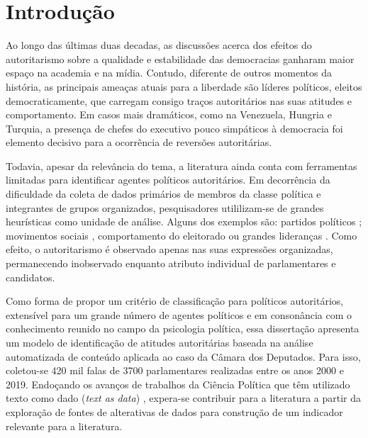 \documentclass[
12pt,				%
openright,			%
twoside,			%
a4paper,			%
english,			%
french,				%
spanish,			%
brazil				%
]{abntex2}
\begin{document}
\chapter{Introdução}

Ao longo das últimas duas decadas, as discussões acerca dos efeitos do autoritarismo sobre a qualidade e estabilidade das democracias ganharam maior espaço na academia e na mídia. Contudo, diferente de outros momentos da história, as principais ameaças atuais para a liberdade são líderes políticos, eleitos democraticamente, que carregam consigo traços autoritários nas suas atitudes e comportamento. Em casos mais dramáticos, como na Venezuela, Hungria e Turquia, a presença de chefes do executivo pouco simpáticos à democracia foi elemento decisivo para a ocorrência de reversões autoritárias.

Todavia, apesar da relevância do tema, a literatura ainda conta com ferramentas limitadas para identificar agentes políticos autoritários. Em decorrência da dificuldade da coleta de dados primários de membros da classe política e integrantes de grupos organizados, pesquisadores utililizam-se de grandes heurísticas como unidade de análise. Alguns dos exemplos são: partidos políticos \cite{mudde2009populist, loxton2014authoritarian, mudde2016introduction}; movimentos sociais \cite{caiani2017radical}, comportamento do eleitorado \cite{booth1984political, seligson2003democracies, seligson2005feeding, rydgren2007sociology} ou grandes lideranças \cite{levitsky2018democracies, norris2019cultural}. Como efeito, o autoritarismo é observado apenas nas suas expressões organizadas, permanecendo inobservado enquanto atributo individual de parlamentares e candidatos.

Como forma de propor um critério de classificação para políticos autoritários, extensível para um grande número de agentes políticos e em consonância com o conhecimento reunido no campo da psicologia política, essa dissertação apresenta um modelo de identificação de atitudes autoritárias baseada na análise automatizada de conteúdo aplicada ao caso da Câmara dos Deputados. Para isso, coletou-se 420 mil falas de 3700 parlamentares realizadas entre os anos 2000 e 2019. Endoçando os avanços de trabalhos da Ciência Política que têm utilizado texto como dado (\emph{text as data}) \cite{batista2016mensurando, moreira2016palavra}, expera-se contribuir para a literatura a partir da exploração de fontes de alterativas de dados para construção de um indicador relevante para a literatura. 
\end{document}

